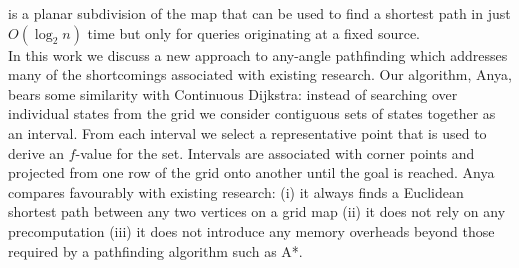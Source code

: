 is a planar subdivision of the map that can be used to find a shortest path in 
just $O(\log_{2}n)$ time but only for queries originating at a fixed source.
\\
In this work we discuss a new approach to any-angle pathfinding which
addresses many of the shortcomings associated with existing research.
Our algorithm, Anya, bears some similarity with Continuous Dijkstra: 
instead of searching over individual states from the grid we consider
contiguous sets of states together as an interval. From each interval we select a 
representative point that is used to derive an $f$-value for the set.
Intervals are associated with corner points and projected from one 
row of the grid onto another until the goal is reached.
Anya compares favourably with existing research: (i)
it always finds a Euclidean shortest path between any two vertices on
a grid map (ii) it does not rely on any precomputation (iii) 
it does not introduce any memory overheads beyond those required by a 
pathfinding algorithm such as A*.

